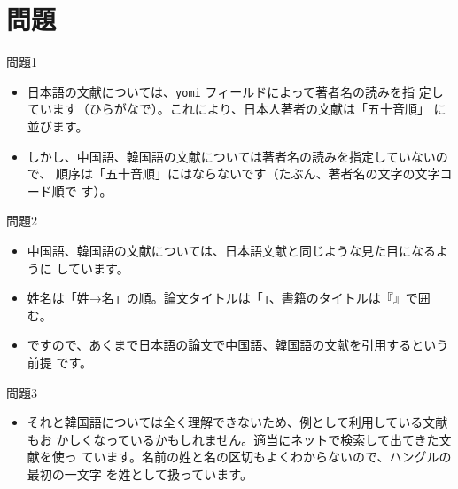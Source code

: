 \documentclass{ltjsarticle}
\begin{document}
\section{問題}

問題1
\begin{itemize}
 \item 日本語の文献については、\texttt{yomi} フィールドによって著者名の読みを指
       定しています（ひらがなで）。これにより、日本人著者の文献は「五十音順」
       に並びます。
 \item しかし、中国語、韓国語の文献については著者名の読みを指定していないので、
       順序は「五十音順」にはならないです（たぶん、著者名の文字の文字コード順で
       す）。
\end{itemize}

問題2
\begin{itemize}
 \item 中国語、韓国語の文献については、日本語文献と同じような見た目になるように
       しています。
 \item 姓名は「姓→名」の順。論文タイトルは「」、書籍のタイトルは『』で囲む。
 \item ですので、あくまで日本語の論文で中国語、韓国語の文献を引用するという前提
       です。
\end{itemize}

問題3
\begin{itemize}
 \item それと韓国語については全く理解できないため、例として利用している文献もお
       かしくなっているかもしれません。適当にネットで検索して出てきた文献を使っ
       ています。名前の姓と名の区切もよくわからないので、ハングルの最初の一文字
       を姓として扱っています。
\end{itemize}



\vspace{1em}


% 

\nocite{*}



%
% 

\end{document}
